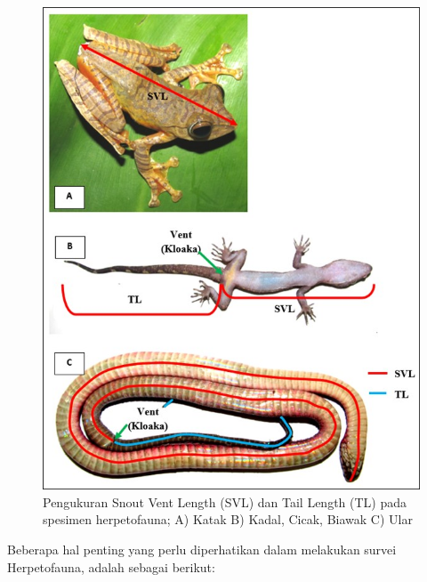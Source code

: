 \documentclass[
]{book}
\begin{document}
\begin{figure}

{\centering \includegraphics[width=1\linewidth]{images/mhf_ilustration} 

}

\caption{Pengukuran Snout Vent Length (SVL) dan Tail Length (TL) pada spesimen herpetofauna; A) Katak B) Kadal, Cicak, Biawak C) Ular}\label{fig:figmhf}
\end{figure}

Beberapa hal penting yang perlu diperhatikan dalam melakukan survei Herpetofauna, adalah sebagai berikut:
\end{document}
